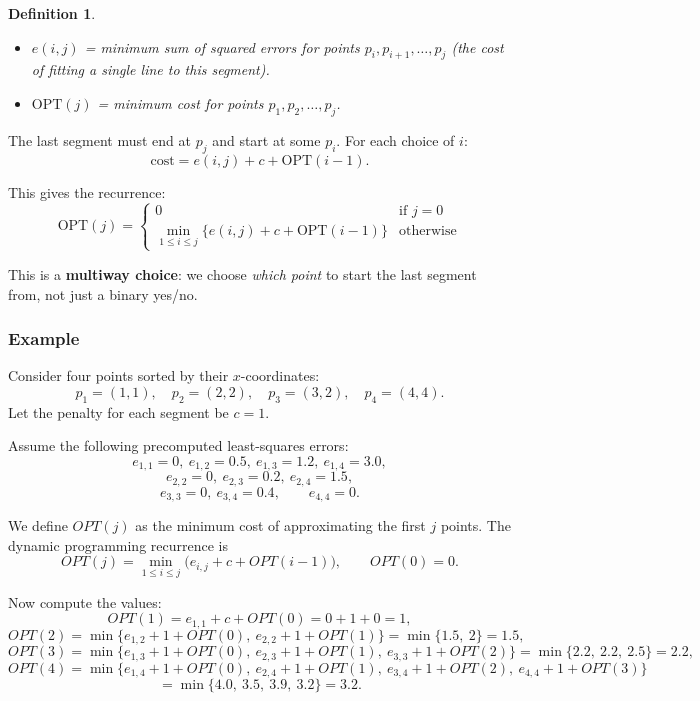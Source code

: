 \documentclass[12pt,a4paper]{report}
\newtheorem{definition}{Definition}
\begin{document}
\begin{definition}
\begin{itemize}
   
    \item $e(i, j)$ = minimum sum of squared errors for points $p_i, p_{i+1}, \ldots, p_j$
    (the cost of fitting a single line to this segment).
     \item $\text{OPT}(j)$ = minimum cost for points $p_1, p_2, \ldots, p_j$.
\end{itemize}
\end{definition}


The last segment must end at $p_j$ and start at some $p_i$. For each choice of $i$:
\[
    \text{cost} = e(i, j) + c + \text{OPT}(i - 1).
\]

This gives the recurrence:
\[
    \text{OPT}(j) =
    \begin{cases}
        0 & \text{if } j = 0 \\
        \displaystyle\min_{1 \leq i \leq j} \bigl\{ e(i, j) + c + \text{OPT}(i-1) \bigr\}
        & \text{otherwise}
    \end{cases}
\]

This is a \textbf{multiway choice}: we choose \emph{which point} to start the last segment
from, not just a binary yes/no.

\subsubsection*{Example}

Consider four points sorted by their $x$-coordinates:
\[
p_1=(1,1), \quad p_2=(2,2), \quad p_3=(3,2), \quad p_4=(4,4).
\]
Let the penalty for each segment be $c=1$.

Assume the following precomputed least-squares errors:
\[
e_{1,1}=0,\ e_{1,2}=0.5,\ e_{1,3}=1.2,\ e_{1,4}=3.0,
\]
\[
e_{2,2}=0,\ e_{2,3}=0.2,\ e_{2,4}=1.5,
\]
\[
e_{3,3}=0,\ e_{3,4}=0.4,\qquad e_{4,4}=0.
\]

We define $OPT(j)$ as the minimum cost of approximating the first $j$ points. The dynamic programming recurrence is
\[
OPT(j)=\min_{1\le i\le j}\bigl(e_{i,j}+c+OPT(i-1)\bigr),
\qquad OPT(0)=0.
\]

Now compute the values:
\[
OPT(1)=e_{1,1}+c+OPT(0)=0+1+0=1,
\]
\[
OPT(2)=\min\{e_{1,2}+1+OPT(0),\ e_{2,2}+1+OPT(1)\}
       =\min\{1.5,\ 2\}=1.5,
\]
\[
OPT(3)=\min\{e_{1,3}+1+OPT(0),\ e_{2,3}+1+OPT(1),\ e_{3,3}+1+OPT(2)\}
       =\min\{2.2,\ 2.2,\ 2.5\}=2.2,
\]
\[
OPT(4)=\min\{e_{1,4}+1+OPT(0),\ e_{2,4}+1+OPT(1),\ e_{3,4}+1+OPT(2),\ e_{4,4}+1+OPT(3)\}
\]
\[
       =\min\{4.0,\ 3.5,\ 3.9,\ 3.2\}=3.2.
\]
\end{document}
